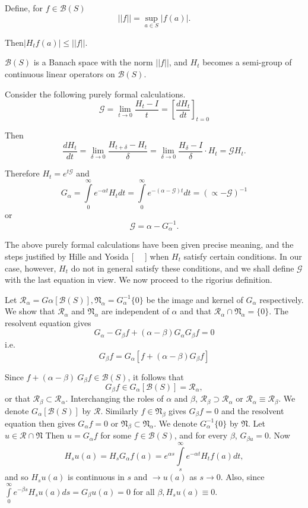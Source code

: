 Define, for $f \in \mathscr{B} (S) $
$$
||  f || = \sup_{a \in S} | f (a) |.
$$

Then\qquad $| H_t f(a) |  \le || f ||$.

$\mathscr{B}(S)$ is a Banach  space with the norm $||  f || $, and
$H_t$ becomes a semi-group of continuous linear operators on
$\mathscr{B}(S)$. 

Consider the following purely formal calculations.
$$
\mathscr{G}= \lim_{t \to 0} \frac{H_t -I}{t} = [ \frac{dH_t} {dt}]_{t
  =0} 
$$

Then\pageoriginale 
$$
\dfrac{dH_t}{dt} = \lim\limits_{\delta  \to 0}
\dfrac{H_{t+\delta}- H_t}{\delta} = \lim\limits_{\delta  \to 0}
\dfrac{H_{\delta} - I}{\delta}\cdot H_t = \mathscr{G} H_t.
$$ 

Therefore $H_t = e^{t \mathscr{G}}$ and 
$$
G_\alpha = \int\limits_{0}^\infty e^{- \alpha t} H_t dt =
  \int\limits_{0}^\infty e^{- ( \alpha - \mathscr{G}) t} dt = (\propto -
  \mathscr{G})^{-1}
$$
or
$$
\mathscr{G}= \alpha - G_\alpha^{-1}.
$$

The above purely formal calculations have been given precise meaning,
and the steps justified by Hille and Yosida [~~ ] when $H_t$ satisfy
certain  conditions. In our case, however, $H_t$ do not in general
satisfy these conditions, and we shall define $\mathscr{G}$ with the
last equation in view. We now proceed to the rigorius definition. 

Let $\mathscr{R}_\alpha = G \alpha [\mathscr{B} (S)],
\mathfrak{N}_\alpha = G^{-1}_\alpha \{ 0\}$ be the image and kernel of
$G_\alpha$ respectively. We show that $\mathscr{R}_\alpha$ and
$\mathfrak{N}_\alpha$ are independent of $\alpha$ and that
$\mathscr{R}_\alpha \cap \mathfrak{N}_\alpha = \{0 \}$. The resolvent
equation gives  
$$
G_\alpha- G_\beta f +  ( \alpha - \beta) G_\alpha G_\beta f =0
$$
i.e. 
$$
G_\beta f=  G_\alpha [ f +  ( \alpha - \beta)
    G_\beta f]
$$

Since $f+  ( \alpha - \beta)~  G_{\beta}  f \in \mathscr{B} (S)$, it
follows that  
$$
G_\beta f \in G_\alpha [ \mathscr{B} (S)]= \mathscr{R}_\alpha,
$$
or that $\mathscr{R}_\beta \subset \mathscr{R}_\alpha$. Interchanging
the roles of $\alpha$ and $\beta$, $\mathscr{R}_\beta \supset
\mathscr{R}_\alpha $ or $\mathscr{R}_\alpha \equiv
\mathscr{R}_\beta$. We denote $G_\alpha [\mathscr{B} (S) ]$ by
$\mathscr{R}$. Similarly $f \in \mathfrak{N}_\beta$\pageoriginale 
gives $G_\beta f =0$ and the resolvent equation  then gives $G_\alpha
f= 0$ or $\mathfrak{N}_\beta \subset \mathfrak{N}_\alpha$. We denote
$G^{-1}_\alpha \{  0\}$ by $\mathfrak{N}$. Let $u \in \mathscr{R} \cap
\mathfrak{N}$ Then $u = G_\alpha f$ for some $f \in  \mathscr{B} (S)$, 
and for every $\beta$, $G_{\beta u}=0$. Now 
$$
H_s u(a) = H_s G_\alpha f(a) = e^{\alpha s} \int\limits^{\infty}_s
e^{- \alpha t} H_t f(a) dt, 
$$
and so $H_s u(a)$ is continuous in $s$ and $\to u(a)$ as $s \to
0$. Also, since $\int\limits_{0}^\infty e^{- \beta s} H_s u(a) ds = 
G_{\beta} u(a) =0$  for all $\beta, H_s u(a) \equiv 0$. 

